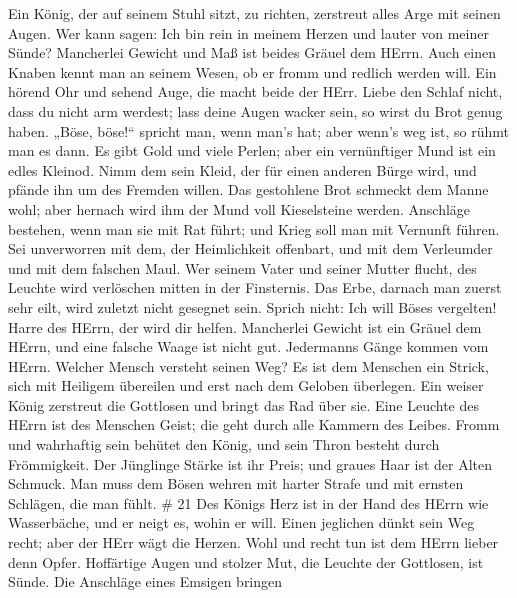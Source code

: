  Ein König, der auf seinem Stuhl sitzt, zu richten,
zerstreut alles Arge mit seinen Augen.  Wer kann sagen: Ich
bin rein in meinem Herzen und lauter von meiner Sünde? 
Mancherlei Gewicht und Maß ist beides Gräuel dem HErrn. 
Auch einen Knaben kennt man an seinem Wesen, ob er fromm und redlich
werden will.  Ein hörend Ohr und sehend Auge, die macht
beide der HErr.  Liebe den Schlaf nicht, dass du nicht arm
werdest; lass deine Augen wacker sein, so wirst du Brot genug haben.
 „Böse, böse!{}`` spricht man, wenn man's hat; aber wenn's
weg ist, so rühmt man es dann.  Es gibt Gold und viele
Perlen; aber ein vernünftiger Mund ist ein edles Kleinod. 
Nimm dem sein Kleid, der für einen anderen Bürge wird, und pfände ihn um
des Fremden willen.  Das gestohlene Brot schmeckt dem Manne
wohl; aber hernach wird ihm der Mund voll Kieselsteine werden.
 Anschläge bestehen, wenn man sie mit Rat führt; und Krieg
soll man mit Vernunft führen.  Sei unverworren mit dem, der
Heimlichkeit offenbart, und mit dem Verleumder und mit dem falschen
Maul.  Wer seinem Vater und seiner Mutter flucht, des
Leuchte wird verlöschen mitten in der Finsternis.  Das
Erbe, darnach man zuerst sehr eilt, wird zuletzt nicht gesegnet sein.
 Sprich nicht: Ich will Böses vergelten! Harre des HErrn,
der wird dir helfen.  Mancherlei Gewicht ist ein Gräuel dem
HErrn, und eine falsche Waage ist nicht gut.  Jedermanns
Gänge kommen vom HErrn. Welcher Mensch versteht seinen Weg?
 Es ist dem Menschen ein Strick, sich mit Heiligem
übereilen und erst nach dem Geloben überlegen.  Ein weiser
König zerstreut die Gottlosen und bringt das Rad über sie. 
Eine Leuchte des HErrn ist des Menschen Geist; die geht durch alle
Kammern des Leibes.  Fromm und wahrhaftig sein behütet den
König, und sein Thron besteht durch Frömmigkeit.  Der
Jünglinge Stärke ist ihr Preis; und graues Haar ist der Alten Schmuck.
 Man muss dem Bösen wehren mit harter Strafe und mit
ernsten Schlägen, die man fühlt. \# 21  Des Königs Herz ist
in der Hand des HErrn wie Wasserbäche, und er neigt es, wohin er will.
 Einen jeglichen dünkt sein Weg recht; aber der HErr wägt
die Herzen.  Wohl und recht tun ist dem HErrn lieber denn
Opfer.  Hoffärtige Augen und stolzer Mut, die Leuchte der
Gottlosen, ist Sünde.  Die Anschläge eines Emsigen bringen
